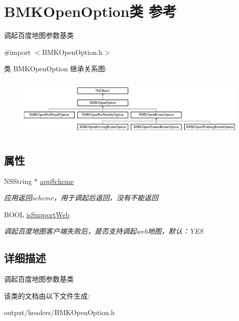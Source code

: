 \hypertarget{interface_b_m_k_open_option}{}\section{B\+M\+K\+Open\+Option类 参考}
\label{interface_b_m_k_open_option}


调起百度地图参数基类  




{\ttfamily \#import $<$B\+M\+K\+Open\+Option.\+h$>$}

类 B\+M\+K\+Open\+Option 继承关系图\+:\begin{figure}[H]
\begin{center}
\leavevmode
\includegraphics[height=2.931937cm]{interface_b_m_k_open_option}
\end{center}
\end{figure}
\subsection*{属性}
\begin{DoxyCompactItemize}
\item 
\hypertarget{interface_b_m_k_open_option_a4a448a4a98f0356752d5c9e8a6695c95}{}N\+S\+String $\ast$ \hyperlink{interface_b_m_k_open_option_a4a448a4a98f0356752d5c9e8a6695c95}{app\+Scheme}\label{interface_b_m_k_open_option_a4a448a4a98f0356752d5c9e8a6695c95}

\begin{DoxyCompactList}\small\item\em 应用返回scheme，用于调起后返回，没有不能返回 \end{DoxyCompactList}\item 
\hypertarget{interface_b_m_k_open_option_ad49edcd0ce8b2bfde35acf1d9fcf35d2}{}B\+O\+O\+L \hyperlink{interface_b_m_k_open_option_ad49edcd0ce8b2bfde35acf1d9fcf35d2}{is\+Support\+Web}\label{interface_b_m_k_open_option_ad49edcd0ce8b2bfde35acf1d9fcf35d2}

\begin{DoxyCompactList}\small\item\em 调起百度地图客户端失败后，是否支持调起web地图，默认：\+Y\+E\+S \end{DoxyCompactList}\end{DoxyCompactItemize}


\subsection{详细描述}
调起百度地图参数基类 

该类的文档由以下文件生成\+:\begin{DoxyCompactItemize}
\item 
output/headers/B\+M\+K\+Open\+Option.\+h\end{DoxyCompactItemize}
